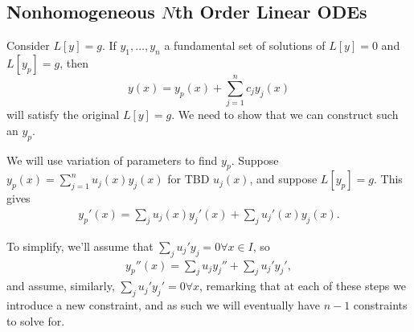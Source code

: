 \subsection{Nonhomogeneous \texorpdfstring{$N$}{N}th Order Linear ODEs}

Consider $L[y] = g$. If $y_1, \dots, y_n$ a fundamental set of solutions of $L[y] = 0$ and $L[y_p] = g$, then \[
y (x) = y_p(x) + \sum_{j=1}^n c_j y_j(x)    
\]
will satisfy the original $L[y] = g$. We need to show that we can construct such an $y_p$.

We will use variation of parameters to find $y_p$. Suppose $y_p(x) = \sum_{j=1}^n u_j(x) y_j(x)$ for TBD $u_j(x)$, and suppose $L[y_p] = g$. This gives\begin{align*}
    y_p'(x) = \sum_{j}u_j(x)y_j'(x) + \sum_{j}u_j'(x)y_j(x).
\end{align*}

To simplify, we'll assume that $\sum_{j} u_j'y_j = 0 \forall x \in I$, so
\begin{align*}
    y_p''(x) = \sum_{j}u_jy_j''+\sum_ju_j'y_j',
\end{align*}
and assume, similarly, $\sum_ju_j'y_j' = 0 \forall x$, remarking that at each of these steps we introduce a new constraint, and as such we will eventually have $n - 1$ constraints to solve for.
